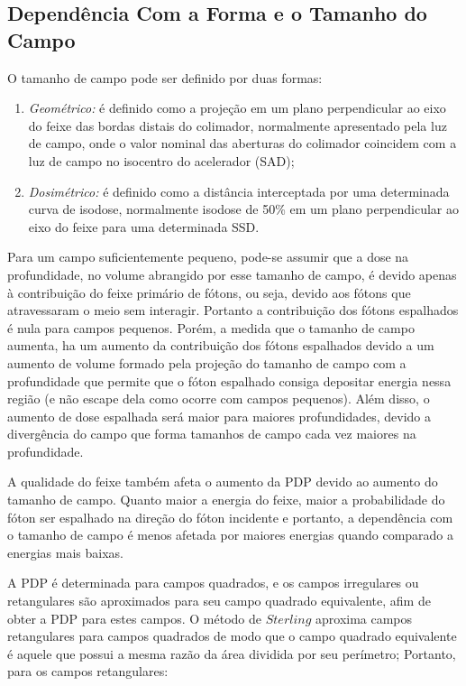 \documentclass[11pt,a4paper]{article}
\begin{document}
	
	\subsection{Dependência Com a Forma e o Tamanho do Campo}

	O tamanho de campo pode ser definido por duas formas:

	\begin{enumerate}
		\item \textit{\textcolor{CarnationPink}{Geométrico:}} é definido como a projeção em um plano perpendicular ao eixo do feixe das bordas distais do colimador, normalmente apresentado pela luz de campo, onde o valor nominal das aberturas do colimador coincidem com a luz de campo no isocentro do acelerador (SAD);
		\item \textit{\textcolor{CarnationPink}{Dosimétrico:}} é definido como a distância interceptada por uma determinada curva de isodose, normalmente isodose de 50\% em um plano perpendicular ao eixo do feixe para uma determinada SSD. 
	\end{enumerate}

	Para um campo suficientemente pequeno, pode-se assumir que a dose na profundidade, no volume abrangido por esse tamanho de campo, é devido apenas à contribuição do feixe primário de fótons, ou seja, devido aos fótons que atravessaram o meio sem interagir. Portanto a contribuição dos fótons espalhados é nula para campos pequenos. Porém, a medida que o tamanho de campo aumenta, ha um aumento da contribuição dos fótons espalhados devido a um aumento de volume formado pela projeção do tamanho de campo com a profundidade que permite que o fóton espalhado consiga depositar energia nessa região (e não escape dela como ocorre com campos pequenos). Além disso, o aumento de dose espalhada será maior para maiores profundidades, devido a divergência do campo que forma tamanhos de campo cada vez maiores na profundidade.

	A qualidade do feixe também afeta o aumento da PDP devido ao aumento do tamanho de campo. Quanto maior a energia do feixe, maior a probabilidade do fóton ser espalhado na direção do fóton incidente e portanto, a dependência com o tamanho de campo é menos afetada por maiores energias quando comparado a energias mais baixas.

	A PDP é determinada para campos quadrados, e os campos irregulares ou retangulares são aproximados para seu campo quadrado equivalente, afim de obter a PDP para estes campos. O método de $Sterling$ aproxima campos retangulares para campos quadrados de modo que o campo quadrado equivalente é aquele que possui a mesma razão da área dividida por seu perímetro; Portanto, para os campos retangulares:
\end{document}
